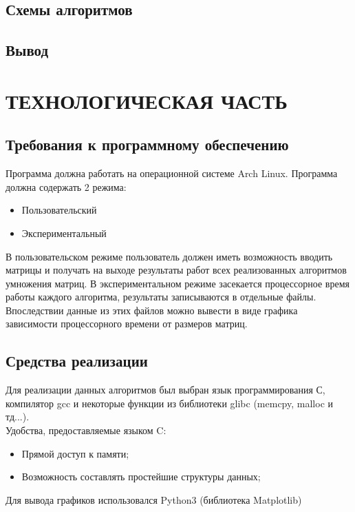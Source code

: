 \documentclass[a4paper,12pt]{article}
\begin{document}
\newpage
\subsection{Схемы алгоритмов}

\newpage
\subsection{Вывод}

\newpage
\section{ТЕХНОЛОГИЧЕСКАЯ ЧАСТЬ}
\subsection{Требования к программному обеспечению}

\begin{flushleft}
Программа должна работать на операционной системе Arch Linux. Программа должна
содержать 2 режима:
\begin{itemize}
\item Пользовательский
\item Экспериментальный
\end{itemize}
В пользовательском режиме пользователь должен иметь возможность вводить матрицы и получать на выходе результаты работ всех реализованных алгоритмов умножения матриц. В экспериментальном режиме засекается процессорное время работы каждого алгоритма, результаты записываются в отдельные файлы. Впоследствии данные из этих файлов можно вывести в виде графика зависимости процессорного времени от размеров матриц.
\end{flushleft}

\newpage
\subsection{Средства реализации}
Для реализации данных алгоритмов был выбран язык программирования С, компилятор
gcc и некоторые функции из библиотеки glibc (memcpy, malloc и тд...). \\
Удобства, предоставляемые языком C:
\begin{itemize}
\item Прямой доступ к памяти;
\item Возможность составлять простейшие структуры данных;
\end{itemize}
Для вывода графиков использовался Python3 (библиотека Matplotlib)
\end{document}
